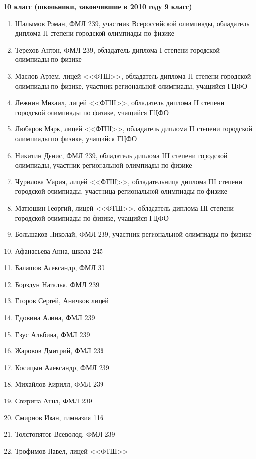 \textbf{10 класс (школьники, закончившие в 2010 году 9 класс)}
\begin{enumerate}
\item Шалымов Роман, ФМЛ 239, участник Всероссийской олимпиады, обладатель диплома II степени городской олимпиады по физике
\item Терехов Антон, ФМЛ 239, обладатель диплома I степени городской олимпиады по физике
\item Маслов Артем, лицей <<ФТШ>>, обладатель диплома II степени
  городской олимпиады по физике, участник региональной олимпиады,
  учащийся ГЦФО
\item Лежнин Михаил, лицей <<ФТШ>>, обладатель диплома II степени
  городской олимпиады по физике, учащийся ГЦФО
\item Любаров Марк, лицей <<ФТШ>>, обладатель диплома II степени
  городской олимпиады по физике, учащийся ГЦФО
\item Никитин Денис, ФМЛ 239, обладатель диплома III степени городской олимпиады, участник региональной олимпиады по физике
\item Чурилова Мария, лицей <<ФТШ>>, обладательница диплома III степени городской олимпиады, участница региональной олимпиады по физике
\item Матюшин Георгий, лицей <<ФТШ>>, обладатель диплома III степени
  городской олимпиады по физике, учащийся ГЦФО
\item Большаков Николай, ФМЛ 239, участник региональной олимпиады по физике
\item Афанасьева Анна, школа 245
\item Балашов Александр, ФМЛ 30
\item Борздун Наталья, ФМЛ 239
\item Егоров Сергей, Аничков лицей
\item Едовина Алина, ФМЛ 239
\item Езус Альбина, ФМЛ 239
\item Жаровов Дмитрий, ФМЛ 239
\item Косицын Александр, ФМЛ 239
\item Михайлов Кирилл, ФМЛ 239
\item Свирина Анна, ФМЛ 239
\item Смирнов Иван, гимназия 116
\item Толстопятов Всеволод, ФМЛ 239
\item Трофимов Павел, лицей <<ФТШ>>
\end{enumerate}

